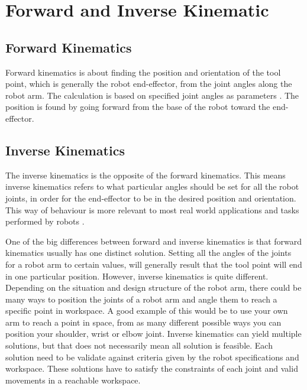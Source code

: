 \section{Forward and Inverse Kinematic}

\subsection{Forward Kinematics}

Forward kinematics is about finding the position and orientation of the tool point, which is generally the robot end-effector, from the joint angles along the robot arm. The calculation is based on specified joint angles as parameters \cite{forward_kinematics}. The position is found by going forward from the base of the robot toward the end-effector. 

\subsection{Inverse Kinematics}

The inverse kinematics is the opposite of the forward kinematics. This means inverse kinematics refers to what particular angles should be set for all the robot joints, in order for the end-effector to be in the desired position and orientation. This way of behaviour is more relevant to most real world applications and tasks performed by robots \cite{inverse_kinematics}. 

One of the big differences between forward and inverse kinematics is that forward kinematics usually has one distinct solution. Setting all the angles of the joints for a robot arm to certain values, will generally result that the tool point will end in one particular position. However, inverse kinematics is quite different. Depending on the situation and design structure of the robot arm, there could be many ways to position the joints of a robot arm and angle them to reach a specific point in workspace. A good example of this would be to use your own arm to reach a point in space, from as many different possible ways you can position your shoulder, wrist or elbow joint. Inverse kinematics can yield multiple solutions, but that does not necessarily mean all solution is feasible. Each solution need to be validate against criteria given by the robot specifications and workspace. These solutions have to satisfy the constraints of each joint and valid movements in a reachable workspace.
